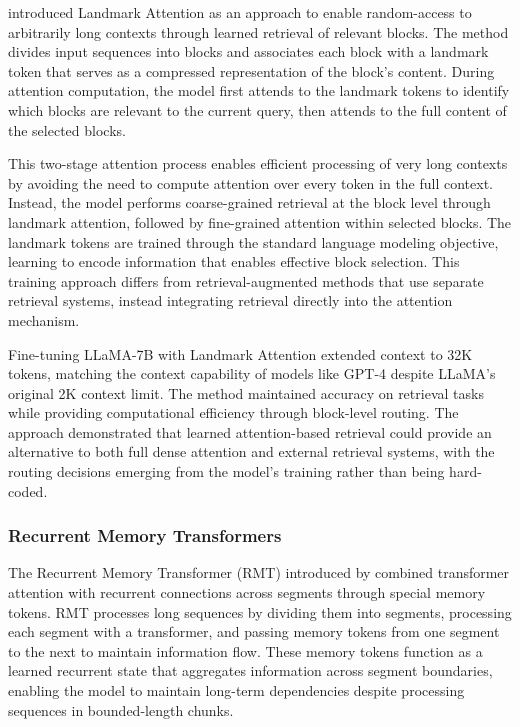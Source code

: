 \citet{mohtashami2023landmark} introduced Landmark Attention as an approach to enable random-access to arbitrarily long contexts through learned retrieval of relevant blocks. The method divides input sequences into blocks and associates each block with a landmark token that serves as a compressed representation of the block's content. During attention computation, the model first attends to the landmark tokens to identify which blocks are relevant to the current query, then attends to the full content of the selected blocks.

This two-stage attention process enables efficient processing of very long contexts by avoiding the need to compute attention over every token in the full context. Instead, the model performs coarse-grained retrieval at the block level through landmark attention, followed by fine-grained attention within selected blocks. The landmark tokens are trained through the standard language modeling objective, learning to encode information that enables effective block selection. This training approach differs from retrieval-augmented methods that use separate retrieval systems, instead integrating retrieval directly into the attention mechanism.

Fine-tuning LLaMA-7B with Landmark Attention extended context to 32K tokens, matching the context capability of models like GPT-4 despite LLaMA's original 2K context limit. The method maintained accuracy on retrieval tasks while providing computational efficiency through block-level routing. The approach demonstrated that learned attention-based retrieval could provide an alternative to both full dense attention and external retrieval systems, with the routing decisions emerging from the model's training rather than being hard-coded.

\subsubsection{Recurrent Memory Transformers}

The Recurrent Memory Transformer (RMT) introduced by \citet{bulatov2022recurrent} combined transformer attention with recurrent connections across segments through special memory tokens. RMT processes long sequences by dividing them into segments, processing each segment with a transformer, and passing memory tokens from one segment to the next to maintain information flow. These memory tokens function as a learned recurrent state that aggregates information across segment boundaries, enabling the model to maintain long-term dependencies despite processing sequences in bounded-length chunks.


